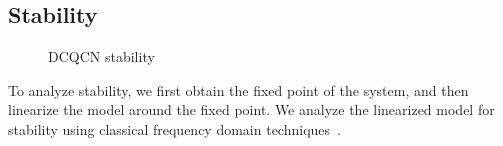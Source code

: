 \subsection{Stability}
\label{sec:dcqcn_stability}

\begin{figure}[t]
\center
{}
\caption{DCQCN stability}
\label{fig:dcqcn_stability}
\end{figure}
To analyze stability, we first obtain the fixed point of the system, and then
linearize the model around the fixed point. We analyze the linearized model for
stability using classical frequency domain techniques~\cite{controltheory}.  


